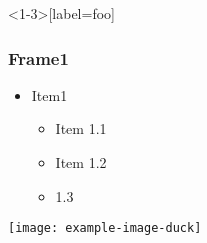 \documentclass{beamer}
\begin{document}
\begin{frame}<1-3>[label=foo]
\frametitle{Frame1}
\begin{itemize}
 \item<+-> Item1
    \begin{itemize}
        \item<+-> Item 1.1
        \item<+-> Item 1.2    
        \item<+-> 1.3
    \end{itemize}
\end{itemize}
\end{frame}

\begin{frame}
\texttt{[image: example-image-duck]}
\end{frame}

\end{document}
